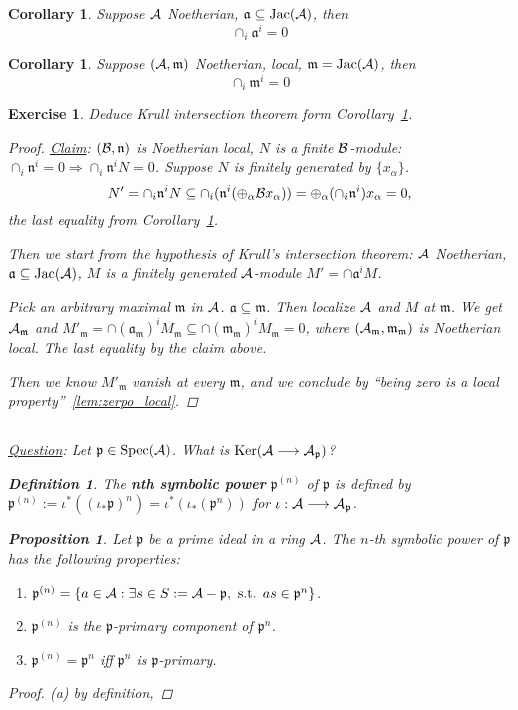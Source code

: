 \documentclass[11pt]{article}
\newtheorem{prop}[thm]{Proposition}
\newtheorem{cor}[thm]{Corollary}
\newtheorem{dfn}[thm]{Definition}
\newtheorem{exercise}[thm]{Exercise}
\newcommand{\sca}{{\mathfrak a}}
\newcommand{\scm}{{\mathfrak m}}
\newcommand{\scn}{{\mathfrak n}}
\newcommand{\scp}{{\mathfrak p}}
\newcommand{\cala}{{\cal A}}
\newcommand{\calb}{{\cal B}}
\newcommand{\Lrta}{\Longrightarrow}
\newcommand{\lrta}{\longrightarrow}
\begin{document}
\begin{cor} Suppose $\cala$ Noetherian, 
$\sca\subseteq \text{Jac}(\cala)$, then
$$\cap_i\sca^i=0$$
\end{cor}
\begin{cor}\label{cor:cor3}
Suppose $(\cala,\scm)$ Noetherian, local, $\scm=\text{Jac}(\cala)$, then
$$
\cap_i\scm^i=0
$$
\end{cor}
\begin{exercise}
Deduce Krull intersection theorem form Corollary~\ref{cor:cor3}.
{\color{red}
\begin{proof}
\underline{Claim}: $(\calb,\scn)$ is Noetherian local, $N$ is a finite $\calb$-module: $\cap_i\scn^i=0\Lrta\cap_i\scn^i N=0$. Suppose $N$ is finitely generated by $\{x_\alpha\}$. 
$$
N'=\cap_i\scn^i N\subseteq \cap_i(\scn^i(\oplus_\alpha \calb x_\alpha))=\oplus_\alpha(\cap_i\scn^i)x_\alpha=0,
$$
the last equality from Corollary~\ref{cor:cor3}.


Then we start from the hypothesis of Krull's intersection theorem: $\cala$ Noetherian, $\sca\subseteq\text{Jac}(\cala)$, $M$ is a finitely generated $\cala$-module $M'=\cap\sca^i M$.

Pick an arbitrary maximal $\scm$ in $\cala$. $\sca\subseteq\scm$. Then localize $\cala$ and $M$ at $\scm$. We get $\cala_\scm$ and $M'_\scm=\cap (\sca_\scm)^i M_\scm\subseteq\cap(\scm_\scm)^i M_\scm=0$, where $(\cala_\scm,\scm_\scm)$ is Noetherian local. The last equality by the claim above.

Then we know $M'_\scm$ vanish at every $\scm$, and we conclude by ``being zero is a local property''~\ref{lem:zerpo_local}.  

\end{proof}
}

\subsection*{}
\underline{Question}: Let $\scp\in \text{Spec}(\cala)$. What is $\text{Ker}(\cala\lrta \cala_\scp)$?
\begin{dfn}\label{def:symbolic_power}
The \textbf{nth symbolic power} $\scp^{(n)}$ of $\scp$ is defined by $\scp^{(n)}:=\iota^*((\iota_*\scp)^n)=\iota^*(\iota_*(\scp^n))$ for $\iota:\cala\lrta \cala_\scp$.
\end{dfn}
\begin{prop}
Let $\scp$ be a prime ideal in  a ring $\cala$. The $n$-th symbolic power of $\scp$ has the following properties:
\begin{enumerate}[label=(\alph*)]
\item $\scp^{(n)}=\{a\in\cala:\exists s\in S:=\cala-\scp, \text{ s.t. } as\in\scp^{n}\}$.
\item $\scp^{(n)}$ is the $\scp$-primary component of $\scp^n$.
\item $\scp^{(n)}=\scp^n$ iff $\scp^n$ is $\scp$-primary.
\end{enumerate}
\begin{proof}
(a) by definition,


\end{proof}
\end{prop}
\end{exercise}
\end{document}

